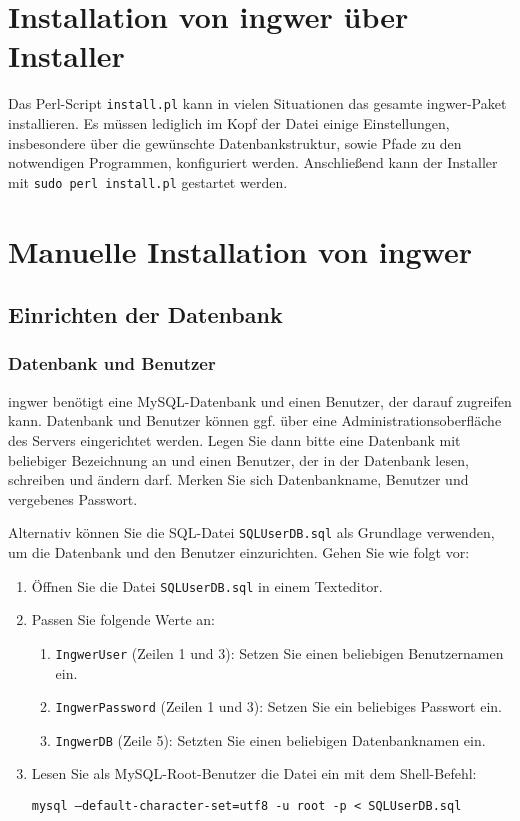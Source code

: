 \documentclass[11pt]{scrartcl} %
\begin{document}
\section{Installation von ingwer \"uber Installer}

Das Perl-Script \texttt{install.pl} kann in vielen Situationen das gesamte ingwer-Paket installieren. Es m\"ussen lediglich im Kopf der Datei einige Einstellungen, insbesondere \"uber die gew\"unschte Datenbankstruktur, sowie Pfade zu den notwendigen Programmen, konfiguriert werden. Anschlie{\ss}end kann der Installer mit \texttt{sudo perl install.pl} gestartet werden.

\section{Manuelle Installation von ingwer}

\subsection{Einrichten der Datenbank}

\subsubsection{Datenbank und Benutzer}
\label{DBUser}

ingwer ben\"otigt eine MySQL-Datenbank und einen Benutzer, der darauf zugreifen kann. Datenbank und Benutzer k\"onnen ggf. \"uber eine Administrationsoberfl\"ache des Servers eingerichtet werden. Legen Sie dann bitte eine Datenbank mit beliebiger Bezeichnung an und einen Benutzer, der in der Datenbank lesen, schreiben und \"andern darf. Merken Sie sich Datenbankname, Benutzer und vergebenes Passwort.

Alternativ k\"onnen Sie die SQL-Datei \texttt{SQLUserDB.sql} als Grundlage verwenden, um die Datenbank und den Benutzer einzurichten. Gehen Sie wie folgt vor:

\begin{enumerate}
\item \"Offnen Sie die Datei \texttt{SQLUserDB.sql} in einem Texteditor.
\item Passen Sie folgende Werte an:
\begin{enumerate}
\item \texttt{IngwerUser} (Zeilen 1 und 3): Setzen Sie einen beliebigen Benutzernamen ein.
\item \texttt{IngwerPassword} (Zeilen 1 und 3): Setzen Sie ein beliebiges Passwort ein.
\item \texttt{IngwerDB} (Zeile 5): Setzten Sie einen beliebigen Datenbanknamen ein.
\end{enumerate}
\item Lesen Sie als MySQL-Root-Benutzer die Datei ein mit dem Shell-Befehl:

\texttt{mysql --default-character-set=utf8 -u root -p < SQLUserDB.sql}
\end{enumerate}
\end{document}
